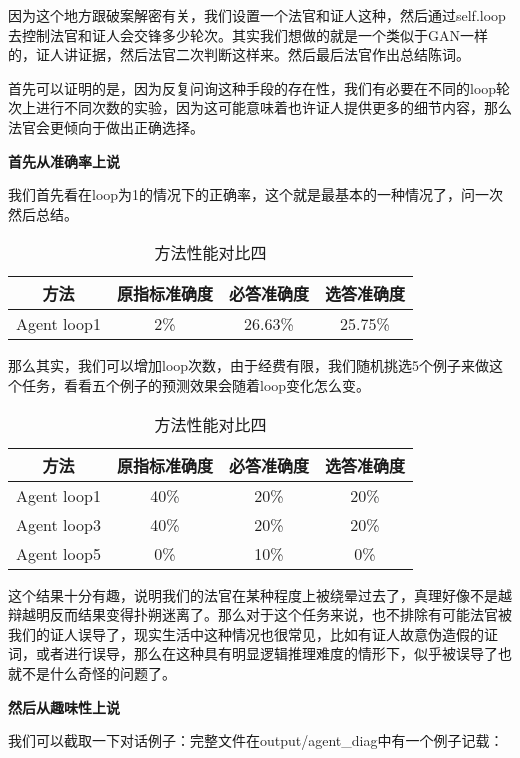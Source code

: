 \documentclass[answers]{exam}  %
\begin{document}
因为这个地方跟破案解密有关，我们设置一个法官和证人这种，然后通过self.loop去控制法官和证人会交锋多少轮次。其实我们想做的就是一个类似于GAN一样的，证人讲证据，然后法官二次判断这样来。然后最后法官作出总结陈词。

首先可以证明的是，因为反复问询这种手段的存在性，我们有必要在不同的loop轮次上进行不同次数的实验，因为这可能意味着也许证人提供更多的细节内容，那么法官会更倾向于做出正确选择。

\textbf{首先从准确率上说}

我们首先看在loop为1的情况下的正确率，这个就是最基本的一种情况了，问一次然后总结。

\begin{table}[h]
    \centering
    \begin{tabular}{cccc}
    \toprule
    \textbf{方法} & \textbf{原指标准确度} & \textbf{必答准确度} &\textbf{选答准确度}\\
    \midrule
    Agent loop1 & 2\% & 26.63\% & 25.75\% \\
    \bottomrule
    \end{tabular}
    \caption{方法性能对比四}
\end{table}

那么其实，我们可以增加loop次数，由于经费有限，我们随机挑选5个例子来做这个任务，看看五个例子的预测效果会随着loop变化怎么变。

\begin{table}[h]
    \centering
    \begin{tabular}{cccc}
    \toprule
    \textbf{方法} & \textbf{原指标准确度} & \textbf{必答准确度} &\textbf{选答准确度}\\
    \midrule
    Agent loop1 & 40\% & 20\% & 20\% \\
    \hline
    Agent loop3 & 40\% & 20\% & 20\% \\
    \hline
    Agent loop5 & 0\% & 10\% & 0\% \\
    \bottomrule
    \end{tabular}
    \caption{方法性能对比四}
\end{table}

这个结果十分有趣，说明我们的法官在某种程度上被绕晕过去了，真理好像不是越辩越明反而结果变得扑朔迷离了。那么对于这个任务来说，也不排除有可能法官被我们的证人误导了，现实生活中这种情况也很常见，比如有证人故意伪造假的证词，或者进行误导，那么在这种具有明显逻辑推理难度的情形下，似乎被误导了也就不是什么奇怪的问题了。

\textbf{然后从趣味性上说}

我们可以截取一下对话例子：完整文件在output/agent\_diag中有一个例子记载：
\end{document}
